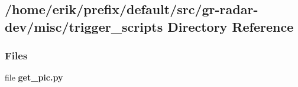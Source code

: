 \subsection{/home/erik/prefix/default/src/gr-\/radar-\/dev/misc/trigger\+\_\+scripts Directory Reference}
\label{dir_860de8103296bf3181d0b726813b1350}
\subsubsection*{Files}
\begin{DoxyCompactItemize}
\item 
file {\bf get\+\_\+pic.\+py}
\end{DoxyCompactItemize}
